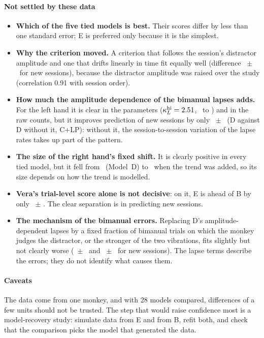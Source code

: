 \paragraph{Not settled by these data}
\begin{itemize}
\item \textbf{Which of the five tied models is best.} Their scores differ by less than one standard error; E is preferred only because it is the simplest.
\item \textbf{Why the criterion moved.} A criterion that follows the session's distractor amplitude and one that drifts linearly in time fit equally well (difference \CritvsOrderLoso\ $\pm$ \CritvsOrderLosoSE\ for new sessions), because the distractor amplitude was raised over the study (correlation 0.91 with session order).
\item \textbf{How much the amplitude dependence of the bimanual lapses adds.} For the left hand it is clear in the parameters ($\kappa^{\mathrm{hi}}_L=2.51$, \cnEkappaHiLeftLo\ to \cnEkappaHiLeftHi) and in the raw counts, but it improves prediction of new sessions by only \cnKappaLoso\ $\pm$ \cnKappaLosoSE\ (D against D without it, C+LP): without it, the session-to-session variation of the lapse rates takes up part of the pattern.
\item \textbf{The size of the right hand's fixed shift.} It is clearly positive in every tied model, but it fell from \muBthreeDRight\ (Model~D) to \cnEbthreeRight\ when the trend was added, so its size depends on how the trend is modelled.
\item \textbf{Vera's trial-level score alone is not decisive}: on it, E is ahead of B by only \cnEminusBTrial\ $\pm$ \cnBvsETrialSE. The clear separation is in predicting new sessions.
\item \textbf{The mechanism of the bimanual errors.} Replacing D's amplitude-dependent lapses by a fixed fraction of bimanual trials on which the monkey judges the distractor, or the stronger of the two vibrations, fits slightly but not clearly worse (\cnCapDistLoso\ $\pm$ \cnCapDistLosoSE\ and \cnCapMaxLoso\ $\pm$ \cnCapMaxLosoSE\ for new sessions). The lapse terms describe the errors; they do not identify what causes them.
\end{itemize}
\paragraph{Caveats}
The data come from one monkey, and with 28 models compared, differences of a few units should not be trusted.
The step that would raise confidence most is a model-recovery study: simulate data from E and from B, refit both, and check that the comparison picks the model that generated the data.


